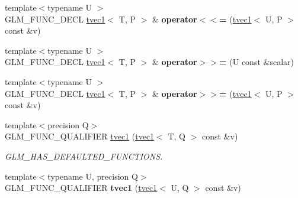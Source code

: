 \begin{DoxyCompactItemize}
\item 
\hypertarget{structglm_1_1tvec1_a2ed7c375c837621c846ee0b31104e34a}{{\footnotesize template$<$typename U $>$ }\\G\-L\-M\-\_\-\-F\-U\-N\-C\-\_\-\-D\-E\-C\-L \hyperlink{structglm_1_1tvec1}{tvec1}$<$ T, P $>$ \& {\bfseries operator$<$$<$=} (\hyperlink{structglm_1_1tvec1}{tvec1}$<$ U, P $>$ const \&v)}\label{structglm_1_1tvec1_a2ed7c375c837621c846ee0b31104e34a}

\item 
\hypertarget{structglm_1_1tvec1_a43e82f4a07db293c852b8924c653d65a}{{\footnotesize template$<$typename U $>$ }\\G\-L\-M\-\_\-\-F\-U\-N\-C\-\_\-\-D\-E\-C\-L \hyperlink{structglm_1_1tvec1}{tvec1}$<$ T, P $>$ \& {\bfseries operator$>$$>$=} (U const \&scalar)}\label{structglm_1_1tvec1_a43e82f4a07db293c852b8924c653d65a}

\item 
\hypertarget{structglm_1_1tvec1_ac7b30c3a71fc6b28c4bceae5a0e92057}{{\footnotesize template$<$typename U $>$ }\\G\-L\-M\-\_\-\-F\-U\-N\-C\-\_\-\-D\-E\-C\-L \hyperlink{structglm_1_1tvec1}{tvec1}$<$ T, P $>$ \& {\bfseries operator$>$$>$=} (\hyperlink{structglm_1_1tvec1}{tvec1}$<$ U, P $>$ const \&v)}\label{structglm_1_1tvec1_ac7b30c3a71fc6b28c4bceae5a0e92057}

\item 
\hypertarget{structglm_1_1tvec1_a70713b0e11c08f57bcd8ab7c58a78ab6}{{\footnotesize template$<$precision Q$>$ }\\G\-L\-M\-\_\-\-F\-U\-N\-C\-\_\-\-Q\-U\-A\-L\-I\-F\-I\-E\-R \hyperlink{structglm_1_1tvec1_a70713b0e11c08f57bcd8ab7c58a78ab6}{tvec1} (\hyperlink{structglm_1_1tvec1}{tvec1}$<$ T, Q $>$ const \&v)}\label{structglm_1_1tvec1_a70713b0e11c08f57bcd8ab7c58a78ab6}

\begin{DoxyCompactList}\small\item\em G\-L\-M\-\_\-\-H\-A\-S\-\_\-\-D\-E\-F\-A\-U\-L\-T\-E\-D\-\_\-\-F\-U\-N\-C\-T\-I\-O\-N\-S. \end{DoxyCompactList}\item 
\hypertarget{structglm_1_1tvec1_a5aac06a8cf1e08a8245e4fe9aeab4afb}{{\footnotesize template$<$typename U, precision Q$>$ }\\G\-L\-M\-\_\-\-F\-U\-N\-C\-\_\-\-Q\-U\-A\-L\-I\-F\-I\-E\-R {\bfseries tvec1} (\hyperlink{structglm_1_1tvec1}{tvec1}$<$ U, Q $>$ const \&v)}\label{structglm_1_1tvec1_a5aac06a8cf1e08a8245e4fe9aeab4afb}


\end{DoxyCompactItemize}
